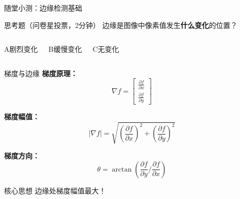 \begin{frame}{随堂小测：边缘检测基础}
    \begin{alertblock}{思考题（问卷星投票，2分钟）}
        边缘是图像中像素值发生\textbf{什么变化}的位置？
    \end{alertblock}

    \begin{columns}
        \begin{block}{A}剧烈变化\end{block}
        \begin{block}{B}缓慢变化\end{block}
        \begin{block}{C}无变化\end{block}
    \end{columns}

\end{frame}

\begin{frame}{梯度与边缘}
    \textbf{梯度原理：}
    $$\nabla f = \begin{bmatrix} \frac{\partial f}{\partial x} \\ \frac{\partial f}{\partial y} \end{bmatrix}$$

    \vspace{0.2cm}

    \textbf{梯度幅值：}
    $$|\nabla f| = \sqrt{(\frac{\partial f}{\partial x})^2 + (\frac{\partial f}{\partial y})^2}$$

    \textbf{梯度方向：}
    $$\theta = \arctan(\frac{\partial f}{\partial y} / \frac{\partial f}{\partial x})$$

    \begin{block}{核心思想}
        边缘处梯度幅值最大！
    \end{block}
\end{frame}

